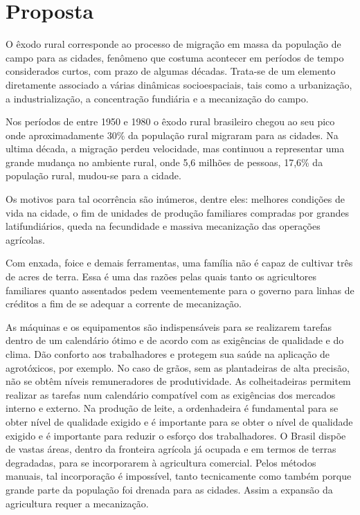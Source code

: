 \chapter{Proposta}
\label{cap:proposta}

O êxodo rural corresponde ao processo de migração em massa da população de campo para as cidades, fenômeno que costuma acontecer em períodos de tempo considerados curtos, com prazo de algumas décadas. Trata-se de um elemento diretamente associado a várias dinâmicas socioespaciais, tais como a urbanização, a industrialização, a concentração fundiária e a mecanização do campo.\cite{Pena2013}

Nos períodos de entre 1950 e 1980 o êxodo rural brasileiro chegou ao seu pico onde aproximadamente 30\% da população rural migraram para as cidades. Na ultima década, a migração perdeu velocidade, mas continuou a representar uma grande mudança no ambiente rural, onde 5,6 milhões de pessoas, 17,6\% da população rural, mudou-se para a cidade.\cite{Marra2011}

Os motivos para tal ocorrência são inúmeros, dentre eles: melhores condições de vida na cidade, o fim de unidades de produção familiares compradas por grandes latifundiários, queda na fecundidade e massiva mecanização das operações agrícolas.

Com enxada, foice e demais ferramentas, uma família não é capaz de cultivar três de acres de terra. Essa é uma das razões pelas quais tanto os agricultores familiares quanto assentados pedem veementemente para o governo para linhas de créditos a fim de se adequar a corrente de mecanização. \cite{Alves2013}

As máquinas e os equipamentos são indispensáveis para se realizarem tarefas dentro de um calendário ótimo e de acordo com as exigências de qualidade e do clima. Dão conforto aos trabalhadores e protegem sua saúde na aplicação de agrotóxicos, por exemplo. No caso de grãos, sem as plantadeiras de alta precisão, não se obtêm níveis remuneradores de produtividade. As colheitadeiras permitem realizar as tarefas num calendário compatível com as exigências dos mercados interno e externo. Na produção de leite, a ordenhadeira é fundamental para se obter nível de qualidade exigido e é importante para se obter o nível de qualidade exigido e é importante para reduzir o esforço dos trabalhadores. O Brasil dispõe de vastas áreas, dentro da fronteira agrícola já ocupada e em termos de terras degradadas, para se incorporarem à agricultura comercial. Pelos métodos manuais, tal incorporação é impossível, tanto tecnicamente como também porque grande parte da população foi drenada para as cidades. Assim a expansão da agricultura requer a mecanização.

